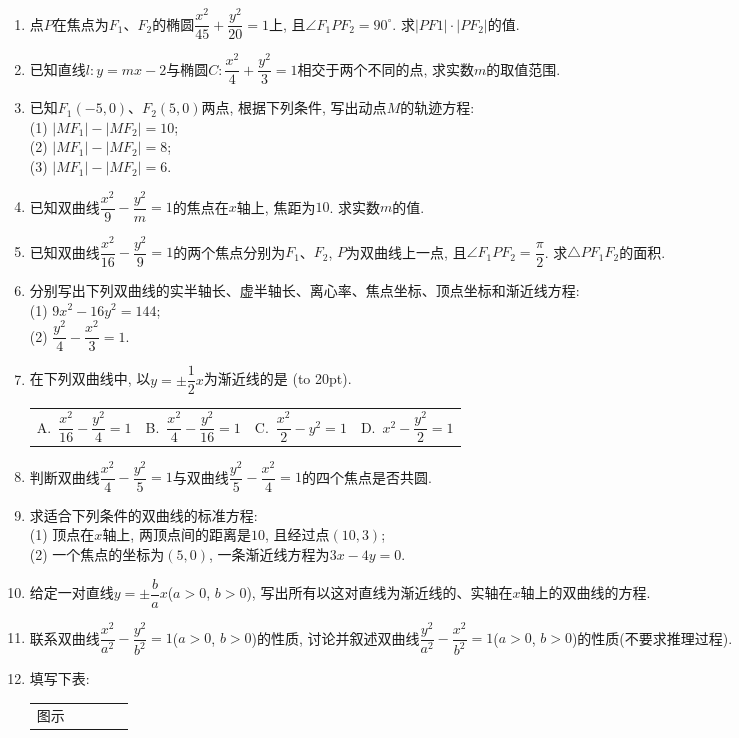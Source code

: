 \documentclass[10pt,a4paper]{article}
\newcommand{\bracket}[1]{(\hbox to #1pt{})}
\newcommand{\fourch}[4]{\par\begin{tabular}{p{.23\textwidth}p{.23\textwidth}p{.23\textwidth}p{.23\textwidth}}
A.~#1 &B.~#2& C.~#3& D.~#4
\end{tabular}}
\begin{document}
\begin{enumerate}[1.]
\item 点$P$在焦点为$F_1$、$F_2$的椭圆$\dfrac{x^2}{45}+\dfrac{y^2}{20}=1$上, 且$\angle F_1PF_2=90^\circ$. 求$|PF1|\cdot |PF_2|$的值.
\item 已知直线$l: y=mx-2$与椭圆$C: \dfrac{x^2}4+\dfrac{y^2}3=1$相交于两个不同的点, 求实数$m$的取值范围.
\item 已知$F_1(-5,0)$、$F_2(5,0)$两点, 根据下列条件, 写出动点$M$的轨迹方程:\\
(1) $|MF_1|-|MF_2|=10$;\\
(2) $|MF_1|-|MF_2|=8$;\\
(3) $|MF_1|-|MF_2|=6$.
\item 已知双曲线$\dfrac{x^2}9-\dfrac{y^2}m=1$的焦点在$x$轴上, 焦距为$10$. 求实数$m$的值.
\item 已知双曲线$\dfrac{x^2}{16}-\dfrac{y^2}9=1$的两个焦点分别为$F_1$、$F_2$, $P$为双曲线上一点, 且$\angle F_1PF_2=\dfrac \pi 2$. 求$\triangle PF_1F_2$的面积. 
\item 分别写出下列双曲线的实半轴长、虚半轴长、离心率、焦点坐标、顶点坐标和渐近线方程:\\
(1) $9x^2-16y^2=144$;\\
(2) $\dfrac{y^2}4-\dfrac{x^2}3=1$.
\item 在下列双曲线中, 以$y=\pm \dfrac 12x$为渐近线的是
\bracket{20}.
\fourch{$\dfrac{x^2}{16}-\dfrac{y^2}4=1$}{$\dfrac{x^2}4-\dfrac{y^2}{16}=1$}{$\dfrac{x^2}2-y^2=1$}{$x^2-
\dfrac{y^2}2=1$}
\item 判断双曲线$\dfrac{x^2}4-\dfrac{y^2}5=1$与双曲线$\dfrac{y^2}5-\dfrac{x^2}4=1$的四个焦点是否共圆. 
\item 求适合下列条件的双曲线的标准方程:\\
(1) 顶点在$x$轴上, 两顶点间的距离是$10$, 且经过点$(10,3)$;\\
(2) 一个焦点的坐标为$(5,0)$, 一条渐近线方程为$3x-4y=0$.
\item 给定一对直线$y=\pm\dfrac ba x$($a>0$, $b>0$), 写出所有以这对直线为渐近线的、实轴在$x$轴上的双曲线的方程.
\item 联系双曲线$\dfrac{x^2}{a^2}-\dfrac{y^2}{b^2}=1$($a>0$, $b>0$)的性质, 讨论并叙述双曲线$\dfrac{y^2}{a^2}-\dfrac{x^2}{b^2}=1$($a>0$, $b>0$)的性质(不要求推理过程).
\item 填写下表:
\begin{center}
\begin{tabular}{|p{}<{\centering}|p{}<{\centering}|p{}<{\centering}|p{}<{\centering}|p{}<{\centering}|}
\hline
图示 & \begin{tikzpicture}[>=latex] 

\end{tikzpicture}
\end{tabular}
\end{center}
\end{enumerate}
\end{document}
